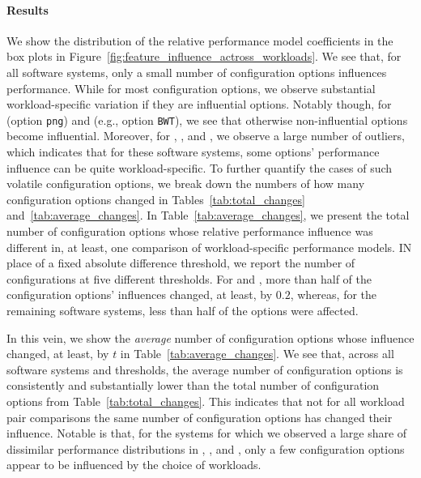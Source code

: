 \paragraph*{Results} 
We show the distribution of the relative performance model coefficients in the box plots in Figure~\ref{fig:feature_influence_actross_workloads}. We see that, for all software systems, only a small number of configuration options influences performance. While for most configuration options, we observe substantial workload-specific variation if they are influential options. Notably though, for \dconvert (option \texttt{png}) and \kanzi (e.g., option \texttt{BWT}), we see that otherwise non-influential options become influential. Moreover, for \batik, \dconvert, and \kanzi, we observe a large number of outliers, which indicates that for these software systems, some options' performance influence can be quite workload-specific.
To further quantify the cases of such volatile configuration options, we break down the numbers of how many configuration options changed in Tables~\ref{tab:total_changes} and~\ref{tab:average_changes}. In Table~\ref{tab:average_changes}, we present the total number of configuration options whose relative performance influence was different in, at least, one comparison of workload-specific performance models. IN place of a fixed absolute difference threshold, we report the number of configurations at five different thresholds. For \jumper and \kanzi, more than half of the configuration options' influences changed, at least, by $0.2$, whereas, for the remaining software systems, less than half of the options were affected.

In this vein, we show the \textit{average} number of configuration options whose influence changed, at least, by $t$ in Table~\ref{tab:average_changes}. We see that, across all software systems and thresholds, the average number of configuration options is consistently and substantially lower than the total number of configuration options from Table~\ref{tab:total_changes}. This indicates that not for all workload pair comparisons the same number of configuration options has changed their influence. Notable is that, for the systems for which we observed a large share of dissimilar performance distributions in , \dconvert, and \htwo, only a few configuration options appear to be influenced by the choice of workloads.

